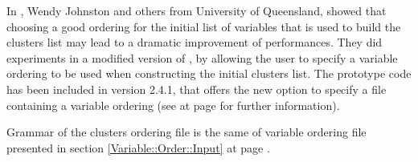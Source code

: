 In \cite{fm06}, Wendy Johnston and others from University of
Queensland, showed that choosing a good ordering for the initial list
of variables that is used to build the clusters list may lead to a
dramatic improvement of performances. They did experiments in a
modified version of \nusmv, by allowing the user to specify a variable
ordering to be used when constructing the initial clusters list. The
prototype code has been included in version 2.4.1, that offers the new
option  to specify a file containing a
variable ordering (see at page \pageref{build::model} for further
information).


Grammar of the clusters ordering file is the same of variable ordering
file presented in section \ref{Variable::Order::Input} at page
\pageref{Variable::Order::Input}.
